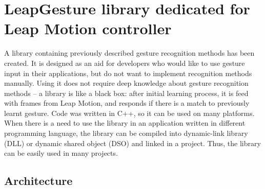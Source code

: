 
\chapter{LeapGesture library dedicated for Leap Motion controller}\label{libraryChapter}


A library containing previously described gesture recognition methods has been created. 
It is designed as an aid for developers who would like to use gesture input in their applications, but do not want to implement recognition methods manually.
Using it does not require deep knowledge about gesture recognition methods -- a library is like a black box: after initial learning process, it is feed with frames from Leap Motion, and responds if there is a match to previously learnt gesture. 
Code was written in C++, so it can be used on many platforms.
When there is a need to use the library in an application written in different programming language, the library can be compiled into dynamic-link library (DLL) or dynamic shared object (DSO) and linked in a project.
Thus, the library can be easily used in many projects.


\section{Architecture} \label{architectureSection}

